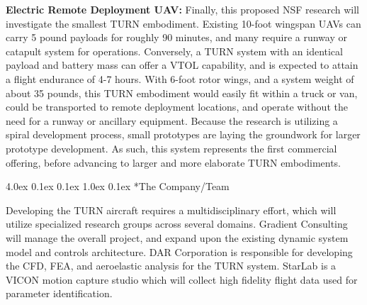 \documentclass[11pt]{article}
\makeatletter
\renewcommand\section{
\@startsection{section}{1}{\z@}%
{4.0ex \@plus 0.1ex \@minus 0.1ex}%
{1.0ex \@plus 0.1ex}%
{\normalfont\LARGE\bfseries}}
\makeatother
\begin{document}
{\bf Electric Remote Deployment UAV:}
Finally, this proposed NSF research will investigate the smallest TURN embodiment.  Existing 10-foot wingspan UAVs can carry 5 pound payloads for roughly 90 minutes, and many require a runway or catapult system for operations.  Conversely, a TURN system with an identical payload and battery mass can offer a VTOL capability, and is expected to attain a flight endurance of 4-7 hours.  With 6-foot rotor wings, and a system weight of about 35 pounds, this TURN embodiment would easily fit within a truck or van, could be transported to remote deployment locations, and operate without the need for a runway or ancillary equipment.  Because the research is utilizing a spiral development process, small prototypes are laying the groundwork for larger prototype development.  As such, this system represents the first commercial offering, before advancing to larger and more elaborate TURN embodiments.








\section*{The Company/Team}  %

Developing the TURN aircraft requires a multidisciplinary effort, which will utilize specialized research groups across several domains.  Gradient Consulting will manage the overall project, and expand upon the existing dynamic system model and controls architecture.  DAR Corporation is responsible for developing the CFD, FEA, and aeroelastic analysis for the TURN system.  StarLab is a VICON motion capture studio which will collect high fidelity flight data used for parameter identification.
\end{document}
